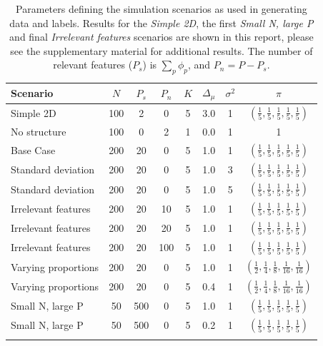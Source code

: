 \documentclass{bioinfo}
\begin{document}
\begin{table}[ht]
	\centering
	\caption{Parameters defining the simulation scenarios as used in generating data and labels. Results for the \emph{Simple 2D}, the first \emph{Small N, large P} and final \emph{Irrelevant features} scenarios are shown in this report, please see the supplementary material for additional results. The number of relevant features (\(P_s\)) is $\sum_p \phi_p$, and $P_n = P - P_s$.}
	\begin{tabular}{l|ccccccc}
		\toprule
		\textbf{Scenario} & $N$ & $P_s$ & $P_n$ & $K$ & $\Delta_{\mu}$ & $\sigma^2$ & $\pi$\\
		\midrule
		Simple 2D & 100 & 2 & 0 & 5 & 3.0 & 1 &  $(\frac{1}{5} , \frac{1}{5}, \frac{1}{5}, \frac{1}{5}, \frac{1}{5})$ \\
		No structure & 100 & 0 & 2 & 1 & 0.0 & 1 & 1 \\
		Base Case & 200 & 20 & 0 & 5 & 1.0 & 1 &  $(\frac{1}{5} , \frac{1}{5}, \frac{1}{5}, \frac{1}{5}, \frac{1}{5})$\\
		Standard deviation & 200 & 20 & 0 & 5 & 1.0 & 3 & $(\frac{1}{5} , \frac{1}{5}, \frac{1}{5}, \frac{1}{5}, \frac{1}{5})$ \\
		Standard deviation & 200 & 20 & 0 & 5 & 1.0 & 5 &  $(\frac{1}{5} , \frac{1}{5}, \frac{1}{5}, \frac{1}{5}, \frac{1}{5})$\\
		Irrelevant features & 200 & 20 & 10 & 5 & 1.0 & 1 &  $(\frac{1}{5} , \frac{1}{5}, \frac{1}{5}, \frac{1}{5}, \frac{1}{5})$\\
		Irrelevant features & 200 & 20 & 20 & 5 & 1.0 & 1 &  $(\frac{1}{5} , \frac{1}{5}, \frac{1}{5}, \frac{1}{5}, \frac{1}{5})$\\
		Irrelevant features & 200 & 20 & 100 & 5 & 1.0 & 1 &  $(\frac{1}{5} , \frac{1}{5}, \frac{1}{5}, \frac{1}{5}, \frac{1}{5})$\\
		Varying proportions & 200 & 20 & 0 & 5 & 1.0 & 1 & $(\frac{1}{2} , \frac{1}{4}, \frac{1}{8}, \frac{1}{16}, \frac{1}{16})$ \\
		Varying proportions & 200 & 20 & 0 & 5 & 0.4 & 1 &  $(\frac{1}{2} , \frac{1}{4}, \frac{1}{8}, \frac{1}{16}, \frac{1}{16})$ \\ %
		Small N, large P & 50 & 500 & 0 & 5 & 1.0 & 1 &  $(\frac{1}{5} , \frac{1}{5}, \frac{1}{5}, \frac{1}{5}, \frac{1}{5})$\\
		Small N, large P & 50 & 500 & 0 & 5 & 0.2 & 1 &  $(\frac{1}{5} , \frac{1}{5}, \frac{1}{5}, \frac{1}{5}, \frac{1}{5})$
		\\
		\botrule
	\end{tabular}
	\label{table:scenarioTable}
\end{table}%
\end{document}
